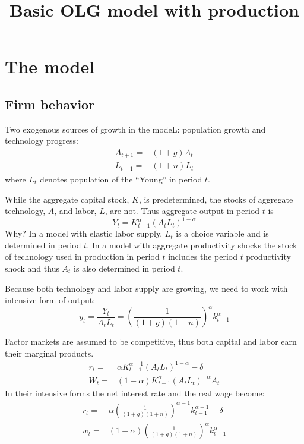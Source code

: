\documentclass[11pt]{article}
\begin{document}
\title{Basic OLG model with production}

\section{The model}

\subsection{Firm behavior}
Two exogenous sources of growth in the modeL: population growth and technology progress:
\begin{align}
A_{t+1} =& (1 + g)A_t \\
L_{t+1} =& (1 + n)L_t 
\end{align}
where $L_t$ denotes population of the ``Young'' in period $t$.

While the aggregate capital stock, $K$, is predetermined, the stocks of aggregate technology, $A$, and labor, $L$, are not. Thus aggregate output in period $t$ is
\begin{equation}
Y_t = K_{t-1}^{\alpha}(A_tL_t)^{1-\alpha} 
\end{equation}
Why? In a model with elastic labor supply, $L_t$ is a choice variable and is determined in period $t$. In a model with aggregate productivity shocks the stock of technology used in production in period $t$ includes the period $t$ productivity shock and thus $A_t$ is also determined in period $t$. 

Because both technology and labor supply are growing, we need to work with intensive form of output:
\begin{equation}\label{eq:production}
y_t = \frac{Y_t}{A_tL_t} = \left(\frac{1}{(1 + g)(1 + n)}\right)^{\alpha}k^{\alpha}_{t-1}
\end{equation}

Factor markets are assumed to be competitive, thus both capital and labor earn their marginal products.
\begin{align}
r_t =& \alpha K_{t-1}^{\alpha - 1}(A_tL_t)^{1 - \alpha} - \delta \\
W_t =& (1 - \alpha) K_{t-1}^{\alpha}(A_tL_t)^{-\alpha}A_t
\end{align}
In their intensive forms the net interest rate and the real wage become:
\begin{align}
r_t =& \alpha \left(\frac{1}{(1 + g)(1 + n)}\right)^{\alpha-1}k^{\alpha-1}_{t-1} - \delta \\
w_t =& (1 - \alpha)\left(\frac{1}{(1 + g)(1 + n)}\right)^{\alpha}k^{\alpha}_{t-1}
\end{align}
\end{document}
